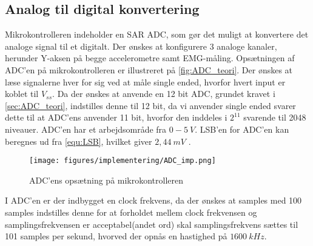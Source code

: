 \subsection{Analog til digital konvertering}
Mikrokontrolleren indeholder en SAR ADC, som gør det muligt at konvertere det analoge signal til et digitalt. Der ønskes at konfigurere 3 analoge kanaler, herunder Y-aksen på begge accelerometre samt EMG-måling. Opsætningen af ADC'en på mikrokontrolleren er illustreret på \autoref{fig:ADC_teori}. Der ønskes at læse signalerne hver for sig ved at måle single ended, hvorfor hvert input er koblet til $V_{ss}$.  Da der ønskes at anvende en 12 bit ADC, grundet kravet i \autoref{sec:ADC_teori}, indstilles denne til 12 bit, da vi anvender single ended svarer dette til at ADC'ens anvender 11 bit, hvorfor den inddeles i $2^{11}$ svarende til 2048 niveauer. ADC'en har et arbejdsområde fra $0-5~V$. LSB'en for ADC'en kan beregnes ud fra \autoref{equ:LSB}, hvilket giver $2,44~mV$  \citep{ADC2014}. 

\begin{figure}[H]
\centering
\texttt{[image: figures/implementering/ADC\_imp.png]}
\caption{ADC'ens opsætning på mikrokontrolleren }
\label{fig:ADC_teori}
\end{figure}

I ADC'en er der indbygget en clock frekvens, da der ønskes at samples med 100 samples indstilles denne for at forholdet mellem clock frekvensen og samplingsfrekvensen er acceptabel(andet ord) skal samplingsfrekvens sættes til 101 samples per sekund, hvorved der opnås en hastighed på $1600~kHz$. 


